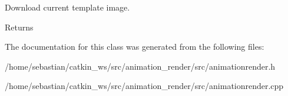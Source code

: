 Download current template image. 

\begin{DoxyReturn}{Returns}

\end{DoxyReturn}


The documentation for this class was generated from the following files\+:\begin{DoxyCompactItemize}
\item 
/home/sebastian/catkin\+\_\+ws/src/animation\+\_\+render/src/animationrender.\+h\item 
/home/sebastian/catkin\+\_\+ws/src/animation\+\_\+render/src/animationrender.\+cpp\end{DoxyCompactItemize}
